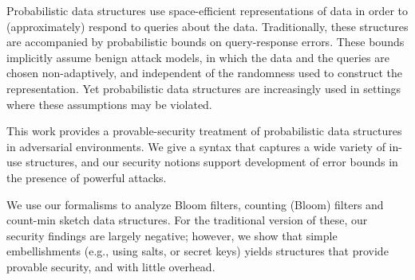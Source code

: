 Probabilistic data structures use space-efficient representations of data in
order to (approximately) respond to queries about the data.  Traditionally,
these structures are accompanied by probabilistic bounds on query-response
errors. These bounds implicitly assume benign attack models, in which the data
and the queries are chosen non-adaptively, and independent of the randomness
used to construct the representation. Yet probabilistic data structures are
increasingly used in settings where these assumptions may be violated.

This work provides a provable-security treatment of probabilistic data
structures in adversarial environments. We give a syntax that captures a wide
variety of in-use structures, and our security notions support development of
error bounds in the presence of powerful attacks.

We use our formalisms to analyze Bloom filters, counting (Bloom) filters and
count-min sketch data structures.  For the traditional version of these, our
security findings are largely negative; however, we show that simple
embellishments (e.g., using salts, or secret keys) yields structures that
provide provable security, and with little overhead.
